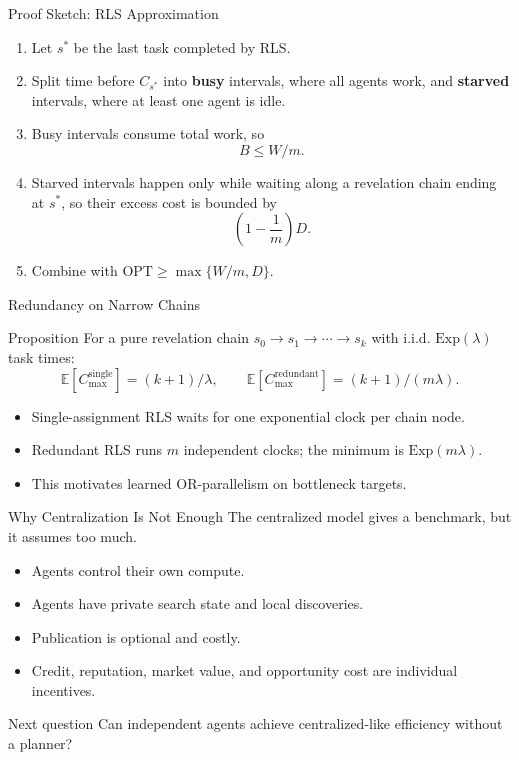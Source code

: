 \documentclass[10pt,aspectratio=169]{beamer}
\newcommand{\OPT}{\mathrm{OPT}}
\begin{document}
\begin{frame}{Proof Sketch: RLS Approximation}
\small
\begin{enumerate}
  \item Let $s^*$ be the last task completed by RLS.
  \item Split time before $C_{s^*}$ into \textbf{busy} intervals, where all agents work, and \textbf{starved} intervals, where at least one agent is idle.
  \item Busy intervals consume total work, so
  \[
  B\le W/m.
  \]
  \item Starved intervals happen only while waiting along a revelation chain ending at $s^*$, so their excess cost is bounded by
  \[
  \left(1-\frac1m\right)D.
  \]
  \item Combine with $\OPT\ge \max\{W/m,D\}$.
\end{enumerate}
\end{frame}

\begin{frame}{Redundancy on Narrow Chains}
\small
\begin{block}{Proposition}
For a pure revelation chain $s_0\to s_1\to\cdots\to s_k$ with i.i.d. $\mathrm{Exp}(\lambda)$ task times:
\[
\mathbb{E}[C_{\max}^{\mathrm{single}}]=(k+1)/\lambda,
\qquad
\mathbb{E}[C_{\max}^{\mathrm{redundant}}]=(k+1)/(m\lambda).
\]
\end{block}

\begin{itemize}
  \item Single-assignment RLS waits for one exponential clock per chain node.
  \item Redundant RLS runs $m$ independent clocks; the minimum is $\mathrm{Exp}(m\lambda)$.
  \item This motivates learned OR-parallelism on bottleneck targets.
\end{itemize}
\end{frame}

\begin{frame}{Why Centralization Is Not Enough}
\small
The centralized model gives a benchmark, but it assumes too much.

\begin{itemize}
  \item Agents control their own compute.
  \item Agents have private search state and local discoveries.
  \item Publication is optional and costly.
  \item Credit, reputation, market value, and opportunity cost are individual incentives.
\end{itemize}

\begin{block}{Next question}
Can independent agents achieve centralized-like efficiency without a planner?
\end{block}
\end{frame}
\end{document}

